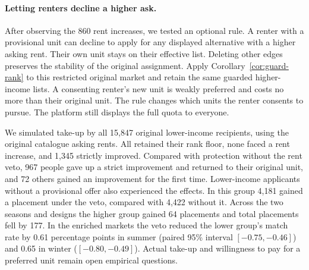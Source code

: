 \paragraph{Letting renters decline a higher ask.}
After observing the 860 rent increases, we tested an optional rule. A renter
with a provisional unit can decline to apply for any displayed alternative
with a higher asking rent. Their own unit stays on their effective list.
Deleting other edges preserves the stability of the original assignment.
Apply Corollary~\ref{cor:guard-rank} to this restricted original market
and retain the same guarded higher-income lists. A consenting renter's
new unit is weakly preferred and costs no more than their original unit.
The rule changes which units the renter consents to pursue. The platform
still displays the full quota to everyone.

We simulated take-up by all 15,847 original lower-income recipients,
using the original catalogue asking rents.
All retained their rank floor, none faced a rent increase, and 1,345 strictly
improved. Compared with protection without the rent veto, 967 people gave
up a strict improvement and returned to their original unit, and 72 others gained
an improvement for the first time. Lower-income applicants without a provisional
offer also experienced the effects. In this group 4,181 gained a placement under the veto,
compared with 4,422 without it. Across the two seasons and designs the higher
group gained 64 placements and total placements fell by 177. In the enriched
markets the veto reduced the lower group's match rate by 0.61 percentage
points in summer (paired 95\% interval $[-0.75,-0.46]$) and 0.65 in winter
($[-0.80,-0.49]$). Actual take-up and willingness to pay for a preferred
unit remain open empirical questions.
